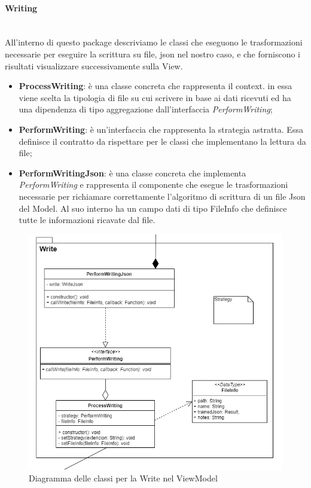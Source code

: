 		\paragraph*{Writing} \mbox{} \\[1mm]
		All'interno di questo package descriviamo le classi che eseguono le trasformazioni necessarie per eseguire la scrittura su file, json nel nostro caso, e che forniscono i risultati visualizzare successivamente sulla View.
		\begin{itemize}
			\item \textbf{ProcessWriting}: è una classe concreta che rappresenta il context. in essa viene scelta la tipologia di file su cui scrivere in base ai dati ricevuti ed ha una dipendenza di tipo aggregazione dall'interfaccia \textit{PerformWriting};
			\item \textbf{PerformWriting}: è un'interfaccia che rappresenta la strategia astratta. Essa definisce il contratto da rispettare per le classi che implementano la lettura da file;
			\item \textbf{PerformWritingJson}: è una classe concreta che implementa \textit{PerformWriting} e rappresenta il componente che esegue le trasformazioni necessarie per richiamare correttamente l'algoritmo di scrittura di un file Json del Model. Al suo interno ha un campo dati di tipo FileInfo che definisce tutte le informazioni ricavate dal file.
		\end{itemize}
		\mbox{}
				\begin{figure} [H]
					\includegraphics[width=\linewidth]{img/Diagrammi/ViewModel-write-app.png}
					\caption{Diagramma delle classi per la Write nel ViewModel}
				\end{figure}
		
